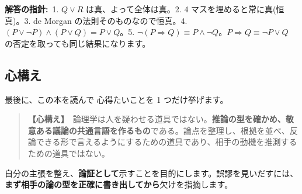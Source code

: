 \documentclass{article}
\begin{document}
\textbf{解答の指針:}\ 1. \(Q \lor R\) は真、よって全体は真。2. 4 マスを埋めると常に真(恒真)。3. de Morgan の法則そのものなので恒真。4. \((P \lor \neg P) \land (P \lor Q) = P \lor Q\)。5. \(\neg(P \Rightarrow Q) \equiv P \land \neg Q\)。\(P \Rightarrow Q \equiv \neg P \lor Q\) の否定を取っても同じ結果になります。

\subsection{心構え}

最後に、この本を読んで 心得たいことを 1 つだけ挙げます。

\begin{quote}
\textbf{【心構え】}\ 論理学は人を疑わせる道具ではない。\textbf{推論の型を確かめ、敬意ある議論の共通言語を作るもの}である。論点を整理し、根拠を並べ、反論できる形で言えるようにするための道具であり、相手の動機を推測するための道具ではない。
\end{quote}

自分の主張を整え、\textbf{論証として}示すことを目的にします。誤謬を見いだすには、\textbf{まず相手の論の型を正確に書き出してから}欠けを指摘します。
\end{document}
